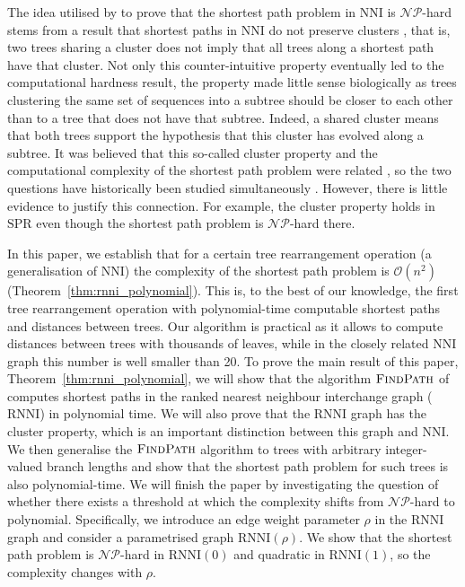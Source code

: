 \documentclass[11pt]{amsart}
\newcommand{\rnni}{\mathrm{RNNI}}
\newcommand{\findpath}{\textsc{FindPath}}
\newcommand{\nni}{\mathrm{NNI}}
\newcommand{\spr}{\mathrm{SPR}}
\newcommand{\np}{\mathcal{NP}}
\renewcommand{\O}{\mathcal O}
\newcommand{\summary}[1]{} %
\begin{document}
\summary{Historically, the complexity question was following hand in hand with the cluster property -- more history plus biological relevance of the property.}
The idea utilised by \textcite{Dasgupta2000-xa} to prove that the shortest path problem in $\nni$ is $\np$-hard stems from a result that shortest paths in $\nni$ do not preserve clusters \autocite{Li1996-zw}, that is, two trees sharing a cluster does not imply that all trees along a shortest path have that cluster.
Not only this counter-intuitive property eventually led to the computational hardness result, the property made little sense biologically as trees clustering the same set of sequences into a subtree should be closer to each other than to a tree that does not have that subtree.
Indeed, a shared cluster means that both trees support the hypothesis that this cluster has evolved along a subtree.
It was believed that this so-called cluster property and the computational complexity of the shortest path problem were related \autocite{Li1996-zw}, so the two questions have historically been studied simultaneously \autocite{Dasgupta2000-xa}.
However, there is little evidence to justify this connection.
For example, the cluster property holds in $\spr$ even though the shortest path problem is $\np$-hard there.

\summary{Paper summary in light of motivation: We've discovered the first efficiently computable distance, given by a parameter range in known tree spaces, and want to understand the reason for the complexity jump -- cite ``Beyond worst-case complexity.''}
In this paper, we establish that for a certain tree rearrangement operation (a generalisation of $\nni$) the complexity of the shortest path problem is $\O(n^2)$ (Theorem~\ref{thm:rnni_polynomial}).
This is, to the best of our knowledge, the first tree rearrangement operation with polynomial-time computable shortest paths and distances between trees.
Our algorithm is practical as it allows to compute distances between trees with thousands of leaves, while in the closely related $\nni$ graph this number is well smaller \autocite{Li1996-zw, Whidden2016-kl} than 20.
To prove the main result of this paper, Theorem~\ref{thm:rnni_polynomial}, we will show that the algorithm $\findpath$ of \textcite{Collienne2019-ca} computes shortest paths in the ranked nearest neighbour interchange graph ($\rnni$) in polynomial time.
We will also prove that the $\rnni$ graph has the cluster property, which is an important distinction between this graph and $\nni$.
We then generalise the $\findpath$ algorithm to trees with arbitrary integer-valued branch lengths and show that the shortest path problem for such trees is also polynomial-time.
We will finish the paper by investigating the question of whether there exists a threshold at which the complexity shifts from $\np$-hard to polynomial.
Specifically, we introduce an edge weight parameter $\rho$ in the $\rnni$ graph and consider a parametrised graph $\rnni(\rho)$.
We show that the shortest path problem is $\np$-hard in $\rnni(0)$ and quadratic in $\rnni(1)$, so the complexity changes with $\rho$.
\end{document}
